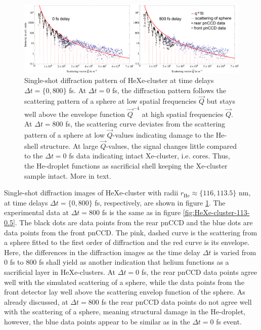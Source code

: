 \begin{figure}
	\centering
		\includegraphics[width=1.00\textwidth]{images/results/HeXe-comparison-0-800-fs.png}
	\caption[Single-shot diffraction patterns of HeXe-cluster at different time delays]{Single-shot diffraction pattern of HeXe-cluster at time delays $\Delta t =\{0,800\}$ fs. At $\Delta t=0$ fs, the diffraction pattern follows the scattering pattern of a sphere at low spatial frequencies $\vec{Q}$ but stays well above the envelope function $\vec{Q}^{-4}$ at high spatial frequencies $\vec{Q}$. At $\Delta t=800$ fs, the scattering curve deviates from the scattering pattern of a sphere at low $\vec{Q}$-values indicating damage to the He-shell structure. At large $\vec{Q}$-values, the signal changes little compared to the $\Delta t=0$ fs data indicating intact Xe-cluster, i.e. cores. Thus, the He-droplet functions as sacrificial shell keeping the Xe-cluster sample intact. More in text.}
	\label{fig:HeXe-comparison-0-800-fs}
\end{figure}
Single-shot diffraction images of HeXe-cluster with radii $r_{\text{He}}\approx\{116, 113.5\}$ nm, at time delays $\Delta t =\{0,800\}$ fs, respectively, are shown in figure \ref{fig:HeXe-comparison-0-800-fs}. The experimental data at $\Delta t = 800$ fs is the same as in figure \ref{fig:HeXe-cluster-113-0.5}. The black dots are data points from the rear pnCCD and the blue dots are data points from the front pnCCD. The pink, dashed curve is the scattering from a sphere fitted to the first order of diffraction and the red curve is its envelope. Here, the differences in the diffraction images as the time delay $\Delta t$ is varied from 0 fs to 800 fs shall yield as another indication that helium functions as a sacrificial layer in HeXe-clusters. At $\Delta t=0$ fs, the rear pnCCD data points agree well with the simulated scattering of a sphere, while the data points from the front detector lay well above the scattering envelop function of the sphere. As already discussed, at $\Delta t = 800$ fs the rear pnCCD data points do not agree well with the scattering of a sphere, meaning structural damage in the He-droplet, however, the blue data points appear to be similar as in the $\Delta t=0$ fs event.\\
